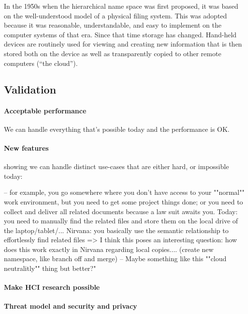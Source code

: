 In the 1950s when the hierarchical name space was first proposed, it was based
on the well-understood model of a physical filing system.  This was adopted
because it was reasonable, understandable, and easy to implement on the computer
systems of that era.  Since that time storage has changed.  Hand-held devices
are routinely used for viewing and creating new information that is then stored
both on the device as well as transparently copied to other remote computers
(``the cloud'').




\subsection{Validation}


\paragraph{Acceptable performance}
We can handle everything that's possible today and the performance is OK. 

\paragraph{New features}
showing we can handle distinct use-cases that are either hard, or impossible today:

    -- for example, you go somewhere where you don't have access to your ""normal"" work environment, but you need to get some project things done; or you need to collect and deliver all related documents because a law suit awaits you.
        Today: you need to manually find the related files and store them on the local drive of the laptop/tablet/...
         Nirvana: you basically use the semantic relationship to effortlessly find related files 
          => I think this poses an interesting question: how does this work exactly in Nirvana regarding local copies.... (create new namespace, like branch off and merge)
    -- Maybe something like this ""cloud neutralitly"" thing but better?"

\paragraph{Make HCI research possible}

\paragraph{Threat model and security and privacy}